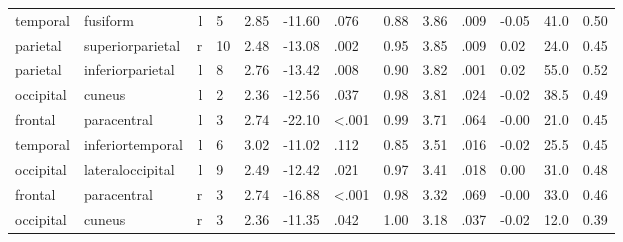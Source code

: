 \documentclass{article}
\begin{document}
\begin{longtable}{llrR{1.5cm}R{1cm}R{1.3cm}R{1cm}R{1cm}R{1.3cm}R{1cm}R{1.8cm}R{1.3cm}R{1.8cm}}
  temporal &                  fusiform &    l &            5 &                  2.85 &           -11.60 &               .076 &                               0.88 &                          3.86 &                            .009 & -0.05 &   41.0 &      0.50 \\
  parietal &          superiorparietal &    r &           10 &                  2.48 &           -13.08 &               .002 &                               0.95 &                          3.85 &                            .009 &  0.02 &   24.0 &      0.45 \\
  parietal &          inferiorparietal &    l &            8 &                  2.76 &           -13.42 &               .008 &                               0.90 &                          3.82 &                            .001 &  0.02 &   55.0 &      0.52 \\
 occipital &                    cuneus &    l &            2 &                  2.36 &           -12.56 &               .037 &                               0.98 &                          3.81 &                            .024 & -0.02 &   38.5 &      0.49 \\
   frontal &               paracentral &    l &            3 &                  2.74 &           -22.10 &      \textless.001 &                               0.99 &                          3.71 &                            .064 & -0.00 &   21.0 &      0.45 \\
  temporal &          inferiortemporal &    l &            6 &                  3.02 &           -11.02 &               .112 &                               0.85 &                          3.51 &                            .016 & -0.02 &   25.5 &      0.45 \\
 occipital &          lateraloccipital &    l &            9 &                  2.49 &           -12.42 &               .021 &                               0.97 &                          3.41 &                            .018 &  0.00 &   31.0 &      0.48 \\
   frontal &               paracentral &    r &            3 &                  2.74 &           -16.88 &      \textless.001 &                               0.98 &                          3.32 &                            .069 & -0.00 &   33.0 &      0.46 \\
 occipital &                    cuneus &    r &            3 &                  2.36 &           -11.35 &               .042 &                               1.00 &                          3.18 &                            .037 & -0.02 &   12.0 &      0.39 \\

\end{longtable}
\end{document}
